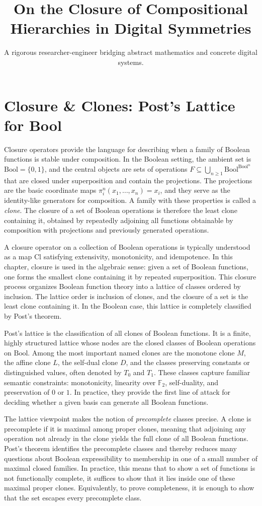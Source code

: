 \documentclass[11pt]{article}
\title{On the Closure of Compositional Hierarchies in Digital Symmetries}
\author{A rigorous researcher-engineer bridging abstract mathematics and concrete digital systems.}
\begin{document}
\section*{Closure \& Clones: Post’s Lattice for Bool}

Closure operators provide the language for describing when a family of Boolean functions is stable under composition. In the Boolean setting, the ambient set is \(\mathrm{Bool}=\{0,1\}\), and the central objects are sets of operations \(F\subseteq \bigcup_{n\ge 1}\mathrm{Bool}^{\mathrm{Bool}^n}\) that are closed under superposition and contain the projections. The projections are the basic coordinate maps \(\pi_i^n(x_1,\dots,x_n)=x_i\), and they serve as the identity-like generators for composition. A family with these properties is called a \emph{clone}. The closure of a set of Boolean operations is therefore the least clone containing it, obtained by repeatedly adjoining all functions obtainable by composition with projections and previously generated operations.

A closure operator on a collection of Boolean operations is typically understood as a map \(\mathrm{Cl}\) satisfying extensivity, monotonicity, and idempotence. In this chapter, closure is used in the algebraic sense: given a set of Boolean functions, one forms the smallest clone containing it by repeated superposition. This closure process organizes Boolean function theory into a lattice of classes ordered by inclusion. The lattice order is inclusion of clones, and the closure of a set is the least clone containing it. In the Boolean case, this lattice is completely classified by Post's theorem.

Post's lattice is the classification of all clones of Boolean functions. It is a finite, highly structured lattice whose nodes are the closed classes of Boolean operations on \(\mathrm{Bool}\). Among the most important named clones are the monotone clone \(M\), the affine clone \(L\), the self-dual clone \(D\), and the classes preserving constants or distinguished values, often denoted by \(T_0\) and \(T_1\). These classes capture familiar semantic constraints: monotonicity, linearity over \(\mathbb{F}_2\), self-duality, and preservation of \(0\) or \(1\). In practice, they provide the first line of attack for deciding whether a given basis can generate all Boolean functions.

The lattice viewpoint makes the notion of \emph{precomplete} classes precise. A clone is precomplete if it is maximal among proper clones, meaning that adjoining any operation not already in the clone yields the full clone of all Boolean functions. Post's theorem identifies the precomplete classes and thereby reduces many questions about Boolean expressibility to membership in one of a small number of maximal closed families. In practice, this means that to show a set of functions is not functionally complete, it suffices to show that it lies inside one of these maximal proper clones. Equivalently, to prove completeness, it is enough to show that the set escapes every precomplete class.
\end{document}
